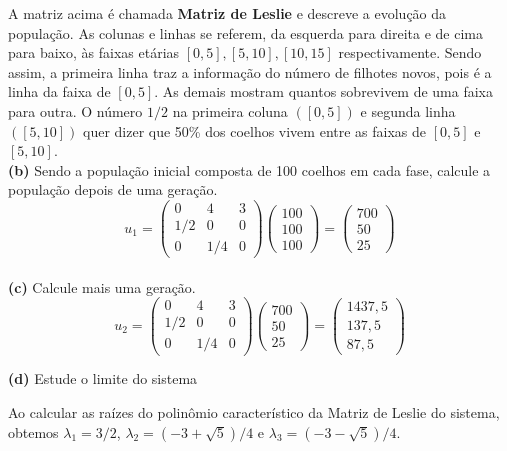 \documentclass[12pt]{article}
\begin{document}
A matriz acima é chamada \textbf{Matriz de Leslie} e descreve a evolução da população. As colunas e linhas se referem, da esquerda para direita e de cima para baixo, às faixas etárias $[0,5],[5,10],[10,15]$ respectivamente. Sendo assim, a primeira linha traz a informação do número de filhotes novos, pois é a linha da faixa de $[0,5]$. As demais mostram quantos sobrevivem de uma faixa para outra. O número $1/2$ na primeira coluna $([0,5])$ e segunda linha $([5,10])$ quer dizer que 50\% dos coelhos vivem entre as faixas de $[0,5]$ e $[5,10]$.\\

\textbf{(b)} Sendo a população inicial composta de 100 coelhos em cada fase, calcule a população depois de uma geração.
\begin{equation*}
	u_1=\begin{pmatrix}
		0 & 4 & 3 \\
		1/2 & 0 & 0 \\
		0 & 1/4 & 0
	\end{pmatrix}\begin{pmatrix}
		100 \\
		100 \\
		100
	\end{pmatrix}=\begin{pmatrix}
		700 \\
		50 \\
		25
	\end{pmatrix}
\end{equation*}\\

\textbf{(c)} Calcule mais uma geração.
\begin{equation*}
	u_2=\begin{pmatrix}
		0 & 4 & 3 \\
		1/2 & 0 & 0 \\
		0 & 1/4 & 0
	\end{pmatrix}\begin{pmatrix}
		700 \\
		50 \\
		25
	\end{pmatrix}=\begin{pmatrix}
		1437,5 \\
		137,5 \\
		87,5
	\end{pmatrix}
\end{equation*}

\textbf{(d)} Estude o limite do sistema

Ao calcular as raízes do polinômio característico da Matriz de Leslie do sistema, obtemos $\lambda_1=3/2$, $\lambda_2=(-3+\sqrt{5})/4$ e $\lambda_3=(-3-\sqrt{5})/4$.
\end{document}
